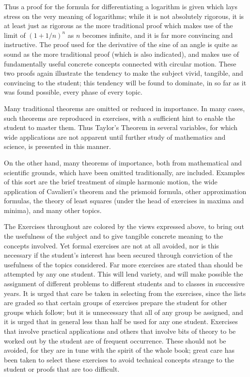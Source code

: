 \documentclass[12pt]{article}
\begin{document}
Thus a proof for the formula for differentiating a logarithm
is given which lays stress on the very meaning of logarithms;
while it is not absolutely rigorous, it is at least just as rigorous
as the more traditional proof which makes use of the limit of
$(1+1/n)^{n}$ as $n$ becomes infinite, and it is far more convincing
and instructive. The proof used for the derivative of the sine
of an angle is quite as sound as the more traditional proof
(which is also indicated), and makes use of fundamentally useful 
concrete concepts connected with circular motion. These
two proofs again illustrate the tendency to make the subject
vivid, tangible, and convincing to the student; this tendency
will be found to dominate, in so far as it was found possible,
every phase of every topic.

Many traditional theorems are omitted or reduced in importance. 
In many cases, such theorems are reproduced in exercises, with 
a sufficient hint to enable the student to master
them. Thus Taylor's Theorem in several variables, for which
wide applications are not apparent until further study of 
mathematics and science, is presented in this manner.

On the other hand, many theorems of importance, both from
mathematical and scientific grounds, which have been omitted
traditionally, are included. Examples of this sort are the brief
treatment of simple harmonic motion, the wide application of
Cavalieri's theorem and the prismoid formula, other approximation 
formulas, the theory of least squares (under the head
of exercises in maxima and minima), and many other topics.

The Exercises throughout are colored by the views expressed
above, to bring out the usefulness of the subject and to give
tangible concrete meaning to the concepts involved. Yet formal
exercises are not at all avoided, nor is this necessary if the
student's interest has been secured through conviction of the
usefulness of the topics considered. Far more exercises are
stated than should be attempted by any one student. This will
lend variety, and will make possible the assignment of different
problems to different students and to classes in successive
years. It is urged that care be taken in selecting from the
exercises, since the lists are graded so that certain groups of
exercises prepare the student for other groups which follow;
but it is unnecessary that all of any group be assigned, and it is
urged that in general less than half be used for any one student. 
Exercises that involve practical applications and others
that involve bits of theory to be worked out by the student are
of frequent occurrence. These should not be avoided, for they
are in tune with the spirit of the whole book; great care has
been taken to select these exercises to avoid technical concepts
strange to the student or proofs that are too difficult.
\end{document}
